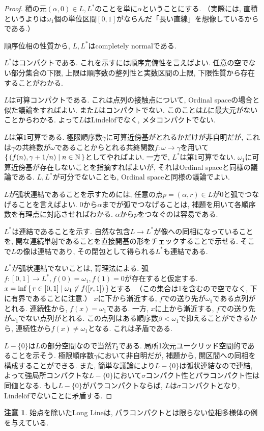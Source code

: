 \documentclass[a4paper, twoside]{bxjsarticle}
\newcommand{\nat}{\mathbb{N}}
\theoremstyle{definition}
\newtheorem{rem}[thm]{注意}
\begin{document}
        \begin{proof}
            積の元$(\alpha, 0)\in L, L^*$のことを単に$\alpha$ということにする. （実際には, 直積というよりは$\omega_1$個の単位区間$[0, 1]$がならんだ「長い直線」を想像しているからである.）
            
            順序位相の性質から, $L, L^*$はcompletely normalである. 
            
            $L^*$はコンパクトである. これを示すには順序完備性を言えばよい. 任意の空でない部分集合の下限, 上限は順序数の整列性と実数区間の上限, 下限性質から存在することがわかる.
            
            $L$は可算コンパクトである. これは点列の接触点について, Ordinal spaceの場合と似た議論をすればよい. また$L$はコンパクトでない. このことは$L$に最大元がないことからわかる. よって$L$はLindelöfでなく, メタコンパクトでない.
            
            $L$は第1可算である. 極限順序数$\gamma$に可算近傍基がとれるかだけが非自明だが, これは$\gamma$の共終数が$\omega$であることからとれる共終関数$f\colon\omega\to\gamma$を用いて$\set{(f(n), \gamma+1/n)|n\in\nat}$としてやればよい. 一方で, $L^*$は第1可算でない. $\omega_1$に可算近傍基が存在しないことを指摘すればよいが, それはOrdinal spaceと同様の議論である. $L, L^*$が可分でないことも, Ordinal spaceと同様の議論でよい. 
            
            $L$が弧状連結であることを示すためには, 任意の点$p=(\alpha, r)\in L$が0と弧でつなげることを言えばよい. 0から$\alpha$までが弧でつなげることは, 補題を用いて各順序数を有理点に対応させればわかる. $\alpha$から$p$をつなぐのは容易である. 
            
            $L^*$は連結であることを示す. 自然な包含$L\to L^*$が像への同相になっていることを, 開な連続単射であることを直接開基の形をチェックすることで示せる. そこで$L$の像は連結であり, その閉包として得られる$L^*$も連結である.
            
            $L^*$が弧状連結でないことは, 背理法による. 弧$f\colon [0, 1]\to L^*, f(0)=\omega_1, f(1)=0$が存在すると仮定する. $x = \inf \set{r\in[0, 1]|\omega_1 \not\in f([r, 1])}$とする. （この集合は1を含むので空でなく, 下に有界であることに注意.） $x$に下から漸近する, $f$での送り先が$\omega_1$である点列がとれる. 連続性から, $f(x)=\omega_1$である. 一方, $x$に上から漸近する, $f$での送り先が$\omega_1$でない点列がとれる. この点列はある順序数$\beta<\omega_1$で抑えることができるから, 連続性から$f(x)\neq\omega_1$となる. これは矛盾である.
            
            $L-\{0\}$は$L$の部分空間なので当然$T_2$である. 局所1次元ユークリッド空間的であることを示そう. 極限順序数$\gamma$において非自明だが, 補題から, 開区間への同相を構成することができる. また, 簡単な議論により$L-\{0\}$は弧状連結なので連結, よって強局所コンパクトな$L-\{0\}$において$\sigma$コンパクト性とパラコンパクト性は同値となる. もし$L-\{0\}$がパラコンパクトならば, $L$は$\sigma$コンパクトとなり, Lindelöfでないことに矛盾する.
            \end{proof}
        \begin{rem}
            始点を除いたLong Lineは, パラコンパクトとは限らない位相多様体の例を与えている. 
        \end{rem}
\end{document}
